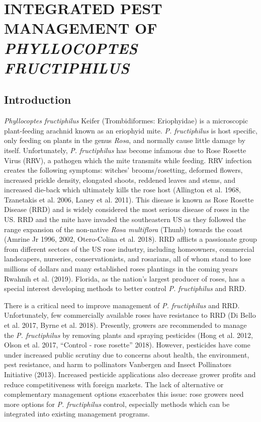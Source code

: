 \documentclass[12pt,final,CPage]{ufthesis}
\begin{document}
{  \hypertarget{integrated-pest-management-of-phyllocoptes-fructiphilus}{%
  \chapter{\texorpdfstring{INTEGRATED PEST MANAGEMENT OF \emph{PHYLLOCOPTES FRUCTIPHILUS}}{INTEGRATED PEST MANAGEMENT OF PHYLLOCOPTES FRUCTIPHILUS}}\label{integrated-pest-management-of-phyllocoptes-fructiphilus}}

  \hypertarget{introduction}{%
  \section{Introduction}\label{introduction}}

  \emph{Phyllocoptes fructiphilus} Keifer (Trombidiformes: Eriophyidae) is a microscopic plant-feeding arachnid known as an eriophyid mite. \emph{P. fructiphilus} is host specific, only feeding on plants in the genus \emph{Rosa}, and normally cause little damage by itself. Unfortunately, \emph{P. fructiphilus} has become infamous due to Rose Rosette Virus (RRV), a pathogen which the mite transmits while feeding. RRV infection creates the following symptoms: witches' brooms/rosetting, deformed flowers, increased prickle density, elongated shoots, reddened leaves and stems, and increased die-back which ultimately kills the rose host (Allington et al. 1968, Tzanetakis et al. 2006, Laney et al. 2011). This disease is known as Rose Rosette Disease (RRD) and is widely considered the most serious disease of roses in the US. RRD and the mite have invaded the southeastern US as they followed the range expansion of the non-native \emph{Rosa multiflora} (Thunb) towards the coast (Amrine Jr 1996, 2002, Otero-Colina et al. 2018). RRD afflicts a passionate group from different sectors of the US rose industry, including homeowners, commercial landscapers, nurseries, conservationists, and rosarians, all of whom stand to lose millions of dollars and many established roses plantings in the coming years Rwahnih et al. (2019). Florida, as the nation's largest producer of roses, has a special interest developing methods to better control \emph{P. fructiphilus} and RRD.

  There is a critical need to improve management of \emph{P. fructiphilus} and RRD. Unfortunately, few commercially available roses have resistance to RRD (Di Bello et al. 2017, Byrne et al. 2018). Presently, growers are recommended to manage the \emph{P. fructiphilus} by removing plants and spraying pesticides (Hong et al. 2012, Olson et al. 2017, {``Control - rose rosette''} 2018). However, pesticides have come under increased public scrutiny due to concerns about health, the environment, pest resistance, and harm to pollinators Vanbergen and Insect Pollinators Initiative (2013). Increased pesticide applications also decrease grower profits and reduce competitiveness with foreign markets. The lack of alternative or complementary management options exacerbates this issue: rose growers need more options for \emph{P. fructiphilus} control, especially methods which can be integrated into existing management programs.

}
\end{document}
